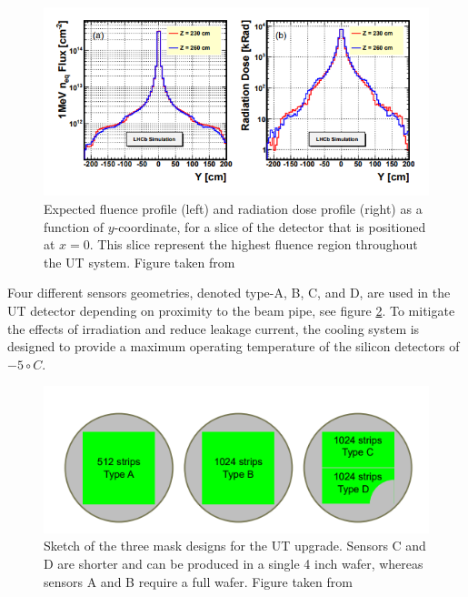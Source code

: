  \begin{figure}[!h]
\centering
\includegraphics{figures/UT_dose.PNG}
\caption{Expected fluence profile (left) and radiation dose profile (right) as a function of $y$-coordinate, for a slice of the detector that is positioned at $x=0$. This slice represent the highest fluence region throughout the UT system. Figure taken from \cite{upgrade_tracker_tdr}
\label{fig:UT_dose}}
\end{figure}

 
 Four different sensors geometries, denoted type-A, B, C, and D, are used in the UT detector depending on proximity to the beam pipe, see figure \ref{fig:UT_sensors}. To mitigate the effects of irradiation and reduce leakage current, the cooling system is designed to provide a maximum operating temperature of the silicon detectors of $-5 \circ C$. 
 
 
 
 \begin{figure}[!h]
\centering
\includegraphics{figures/UT_sensors.PNG}
\caption{Sketch of the three mask designs for the UT upgrade. Sensors C and D are shorter and
can be produced in a single 4 inch wafer, whereas sensors A and B require a full wafer.  Figure taken from \cite{upgrade_tracker_tdr}
\label{fig:UT_sensors}}
\end{figure}


 
 
